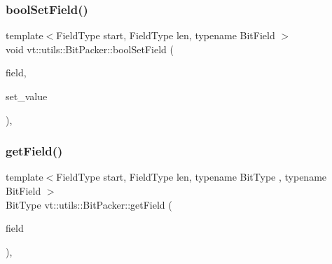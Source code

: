 \subsubsection{\texorpdfstring{bool\+Set\+Field()}{boolSetField()}}
{\footnotesize\ttfamily template$<$Field\+Type start, Field\+Type len, typename Bit\+Field $>$ \\
void vt\+::utils\+::\+Bit\+Packer\+::bool\+Set\+Field (\begin{DoxyParamCaption}\item[{Bit\+Field \&}]{field,  }\item[{bool const \&}]{set\+\_\+value }\end{DoxyParamCaption})\hspace{0.3cm}{\ttfamily [inline]}, {\ttfamily [static]}}

\mbox{\label{structvt_1_1utils_1_1_bit_packer_afe31d75cc9a9198eb732b759424a0535}} 
\subsubsection{\texorpdfstring{get\+Field()}{getField()}}
{\footnotesize\ttfamily template$<$Field\+Type start, Field\+Type len, typename Bit\+Type , typename Bit\+Field $>$ \\
Bit\+Type vt\+::utils\+::\+Bit\+Packer\+::get\+Field (\begin{DoxyParamCaption}\item[{Bit\+Field const \&}]{field }\end{DoxyParamCaption})\hspace{0.3cm}{\ttfamily [inline]}, {\ttfamily [static]}}

\mbox{\label{structvt_1_1utils_1_1_bit_packer_a0f6dd347c6375101ff5f4c9dd4e8413d}} 
